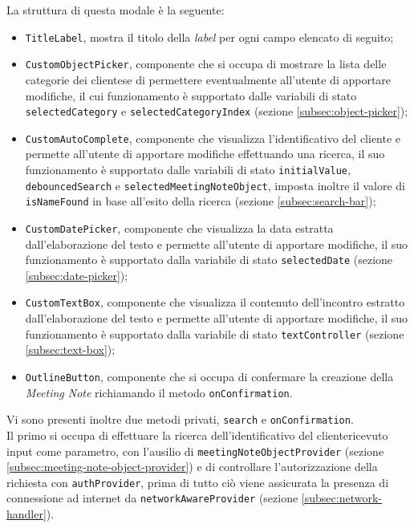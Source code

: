 La struttura di questa modale è la seguente:
\begin{itemize}
    \item \lstinline{TitleLabel}, mostra il titolo della \emph{label} per ogni campo elencato di seguito;
    \item \lstinline{CustomObjectPicker}, componente che si occupa di mostrare la lista delle categorie dei \glspl{cliente}\glsoccur e di permettere eventualmente all'utente di apportare modifiche, il cui funzionamento è supportato dalle variabili di stato \lstinline{selectedCategory} e \lstinline{selectedCategoryIndex} (sezione \ref{subsec:object-picker});
    \item \lstinline{CustomAutoComplete}, componente che visualizza l'identificativo del cliente e permette all'utente di apportare modifiche effettuando una ricerca, il suo funzionamento è supportato dalle variabili di stato \lstinline{initialValue}, \lstinline{debouncedSearch} e \lstinline{selectedMeetingNoteObject}, imposta inoltre il valore di \lstinline{isNameFound} in base all'esito della ricerca (sezione \ref{subsec:search-bar});
    \item \lstinline{CustomDatePicker}, componente che visualizza la data estratta dall'elaborazione del testo e permette all'utente di apportare modifiche, il suo funzionamento è supportato dalla variabile di stato \lstinline{selectedDate} (sezione \ref{subsec:date-picker});
    \item \lstinline{CustomTextBox}, componente che visualizza il contenuto dell'incontro estratto dall'elaborazione del testo e permette all'utente di apportare modifiche, il suo funzionamento è supportato dalla variabile di stato \lstinline{textController} (sezione \ref{subsec:text-box});
    \item \lstinline{OutlineButton}\cite{site:outline-button}, componente che si occupa di confermare la creazione della \emph{Meeting Note} richiamando il metodo \lstinline{onConfirmation}.
\end{itemize}
Vi sono presenti inoltre due metodi privati, \lstinline{search} e \lstinline{onConfirmation}. \\
Il primo si occupa di effettuare la ricerca dell'identificativo del \gls{cliente}\glsoccur ricevuto input come parametro, con l'ausilio di \lstinline{meetingNoteObjectProvider} (sezione \ref{subsec:meeting-note-object-provider}) e di controllare l'autorizzazione della richiesta con \lstinline{authProvider}, prima di tutto ciò viene assicurata la presenza di connessione ad internet da \lstinline{networkAwareProvider} (sezione \ref{subsec:network-handler}). \\
